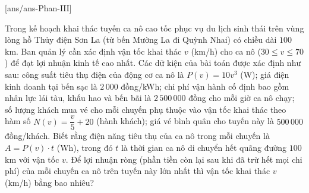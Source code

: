 \caukq
{}[ans/ans\currfilebase-Phan-III]
\begin{ex}%
	Trong kế hoạch khai thác tuyến ca nô cao tốc phục vụ du lịch sinh thái trên vùng lòng hồ Thủy điện Sơn La (từ bến Mường La đi Quỳnh Nhai) có chiều dài $100$\,km. Ban quản lý cần xác định vận tốc khai thác $v$ (km/h) cho ca nô ($30 \le v \le 70$) để đạt lợi nhuận kinh tế cao nhất. Các dữ kiện của bài toán được xác định như sau: công suất tiêu thụ điện của động cơ ca nô là $P(v)=10v^3$ (W); giá điện kinh doanh tại bến sạc là $2\,000$ đồng/kWh; chi phí vận hành cố định bao gồm nhân lực lái tàu, khấu hao và bến bãi là $2\,500\,000$ đồng cho mỗi giờ ca nô chạy; số lượng khách mua vé cho mỗi chuyến phụ thuộc vào vận tốc khai thác theo hàm số $N(v)=\dfrac{v}{5}+20$ (hành khách); giá vé bình quân cho tuyến này là $500\,000$ đồng/khách. Biết rằng điện năng tiêu thụ của ca nô trong mỗi chuyến là $A=P(v) \cdot t$ (Wh), trong đó $t$ là thời gian ca nô di chuyển hết quãng đường $100$\,km với vận tốc $v$.	Để lợi nhuận ròng (phần tiền còn lại sau khi đã trừ hết mọi chi phí) của mỗi chuyến ca nô trên tuyến này lớn nhất thì vận tốc khai thác $v$ (km/h) bằng bao nhiêu?
	\par
\end{ex}
